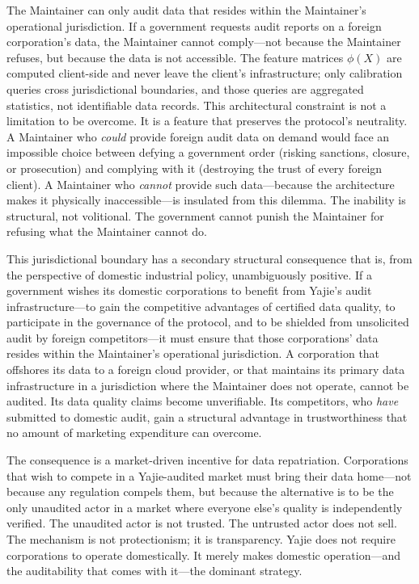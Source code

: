 \documentclass[12pt,a4paper]{ctexart}
\theoremstyle{definition}
\theoremstyle{remark}
\begin{document}
The Maintainer can only audit data that resides within the Maintainer's operational jurisdiction. If a government requests audit reports on a foreign corporation's data, the Maintainer cannot comply—not because the Maintainer refuses, but because the data is not accessible. The feature matrices $\phi(X)$ are computed client-side and never leave the client's infrastructure; only calibration queries cross jurisdictional boundaries, and those queries are aggregated statistics, not identifiable data records. This architectural constraint is not a limitation to be overcome. It is a feature that preserves the protocol's neutrality. A Maintainer who \textit{could} provide foreign audit data on demand would face an impossible choice between defying a government order (risking sanctions, closure, or prosecution) and complying with it (destroying the trust of every foreign client). A Maintainer who \textit{cannot} provide such data—because the architecture makes it physically inaccessible—is insulated from this dilemma. The inability is structural, not volitional. The government cannot punish the Maintainer for refusing what the Maintainer cannot do.

This jurisdictional boundary has a secondary structural consequence that is, from the perspective of domestic industrial policy, unambiguously positive. If a government wishes its domestic corporations to benefit from Yajie's audit infrastructure—to gain the competitive advantages of certified data quality, to participate in the governance of the protocol, and to be shielded from unsolicited audit by foreign competitors—it must ensure that those corporations' data resides within the Maintainer's operational jurisdiction. A corporation that offshores its data to a foreign cloud provider, or that maintains its primary data infrastructure in a jurisdiction where the Maintainer does not operate, cannot be audited. Its data quality claims become unverifiable. Its competitors, who \textit{have} submitted to domestic audit, gain a structural advantage in trustworthiness that no amount of marketing expenditure can overcome.

The consequence is a market-driven incentive for data repatriation. Corporations that wish to compete in a Yajie-audited market must bring their data home—not because any regulation compels them, but because the alternative is to be the only unaudited actor in a market where everyone else's quality is independently verified. The unaudited actor is not trusted. The untrusted actor does not sell. The mechanism is not protectionism; it is transparency. Yajie does not require corporations to operate domestically. It merely makes domestic operation—and the auditability that comes with it—the dominant strategy.
\end{document}
